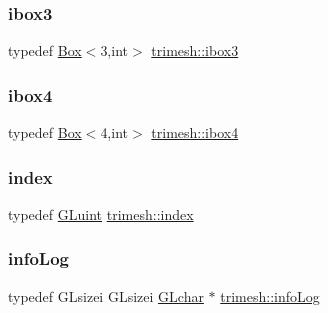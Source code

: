 \mbox{\label{namespacetrimesh_a0f0cee6ebe44dca10921852ee1d70958}} 
\subsubsection{\texorpdfstring{ibox3}{ibox3}}
{\footnotesize\ttfamily typedef \hyperlink{classtrimesh_1_1Box}{Box}$<$3,int$>$ \hyperlink{namespacetrimesh_a0f0cee6ebe44dca10921852ee1d70958}{trimesh\+::ibox3}}

\mbox{\label{namespacetrimesh_a29cfd89f2cbe0ca86947f93f0d0ff9da}} 
\subsubsection{\texorpdfstring{ibox4}{ibox4}}
{\footnotesize\ttfamily typedef \hyperlink{classtrimesh_1_1Box}{Box}$<$4,int$>$ \hyperlink{namespacetrimesh_a29cfd89f2cbe0ca86947f93f0d0ff9da}{trimesh\+::ibox4}}

\mbox{\label{namespacetrimesh_a667dc2743bc31f46137f6d941c9ebf5e}} 
\subsubsection{\texorpdfstring{index}{index}}
{\footnotesize\ttfamily typedef \hyperlink{namespacetrimesh_ad2289423ef47b393854afc30451d433b}{G\+Luint} \hyperlink{namespacetrimesh_a667dc2743bc31f46137f6d941c9ebf5e}{trimesh\+::index}}

\mbox{\label{namespacetrimesh_a98d16a04665554edfd8d50cb1ea434ce}} 
\subsubsection{\texorpdfstring{info\+Log}{infoLog}}
{\footnotesize\ttfamily typedef G\+Lsizei G\+Lsizei \hyperlink{namespacetrimesh_ae0c0512592dbcadf9b11efef0409d165}{G\+Lchar} $\ast$ \hyperlink{namespacetrimesh_a98d16a04665554edfd8d50cb1ea434ce}{trimesh\+::info\+Log}}

\mbox{\label{namespacetrimesh_a70e381a5073e5b5555b5c8c168c9375f}} 

